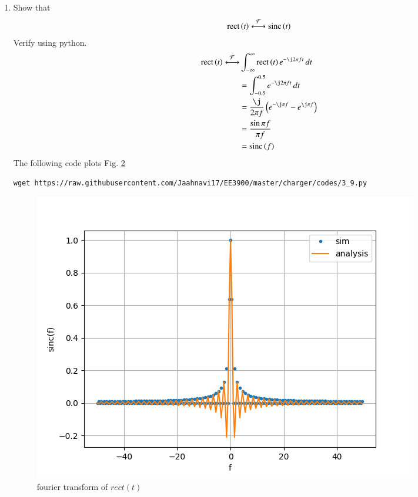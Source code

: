 \documentclass[journal,12pt,twocolumn]{IEEEtran}
\renewcommand\thesection{\arabic{section}}
\begin{document}
\begin{enumerate}[label=\thesection.\arabic*
,ref=\thesection.\theenumi]
\begin{figure}[h!]
	    \caption{fourier transform of $x(t)$ }
	    \label{fig:xt-ft}
	\end{figure}
 \item Show that 
 \begin{align}
	 \text{rect}\left(t\right) \overset{\mathcal{F}}{ \longleftrightarrow} \text{sinc}\left(t\right)
 \end{align}
 Verify using python.\\\solution
 \begin{align}
     \rect{t} \system{F}&\int_{-\infty}^\infty \rect{t}e^{-\j2\pi ft}\,dt\\
     &= \int_{-0.5}^{0.5}e^{-\j2\pi ft}\,dt\\
     &= \frac{\j}{2\pi f}\brak{e^{-\j\pi f}-e^{\j\pi f}}\\
     &= \frac{\sin{\pi f}}{\pi f}\\
     &= \sinc{f}
 \end{align}
  The following code plots Fig. \ref{fig:rect-ft}
	\begin{lstlisting}
wget https://raw.githubusercontent.com/Jaahnavi17/EE3900/master/charger/codes/3_9.py
\end{lstlisting}
	\begin{figure}[h!]
	    \centering
	    \includegraphics[width=\columnwidth]{figures/rect-ft.png}
	    \caption{fourier transform of $rect(t)$ }
	    \label{fig:rect-ft}
	\end{figure}


\end{enumerate}
\end{document}
